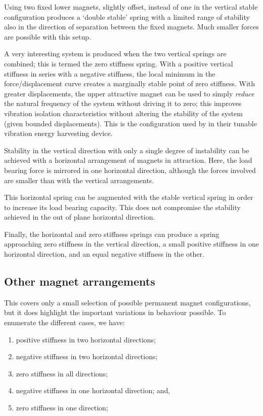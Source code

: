 Using two fixed lower magnets, slightly offset, instead of one in the
vertical stable configuration produces a `double stable' spring with a
limited range of stability also in the direction of separation between
the fixed magnets. Much smaller forces are possible with this setup.

A very interesting system is produced when the two vertical springs
are combined; this is termed the zero stiffness spring. With a
positive vertical stiffness in series with a negative stiffness, the
local minimum in the force/displacement curve creates a marginally
stable point of zero stiffness. With greater displacements, the upper
attractive magnet can be used to simply \emph{reduce} the natural
frequency of the system without driving it to zero; this improves
vibration isolation characteristics without altering the stability of
the system (given bounded displacements). This is the configuration
used by \textcite{challa2008} in their tunable vibration energy
harvesting device.

Stability in the vertical direction with only a single degree of
instability can be achieved with a horizontal arrangement of magnets
in attraction. Here, the load bearing force is mirrored in one
horizontal direction, although the forces involved are smaller than
with the vertical arrangements.

This horizontal spring can be augmented with the stable vertical
spring in order to increase its load bearing capacity. This does not
compromise the stability achieved in the out of plane horizontal
direction.

Finally, the horizontal and zero stiffness springs can produce a
spring approaching zero stiffness in the vertical direction, a small positive
stiffness in one horizontal direction, and an equal negative stiffness
in the other.

\subsection{Other magnet arrangements}

This covers only a small selection of possible permanent magnet
configurations, but it does highlight the important variations in
behaviour possible. To enumerate the different cases, we have:
\begin{enumerate}
\item positive stiffness in two horizontal directions;
\item negative stiffness in two horizontal directions;
\item zero stiffness in all directions;
\item negative stiffness in one horizontal direction; and,
\item zero stiffness in one direction;
\end{enumerate}

